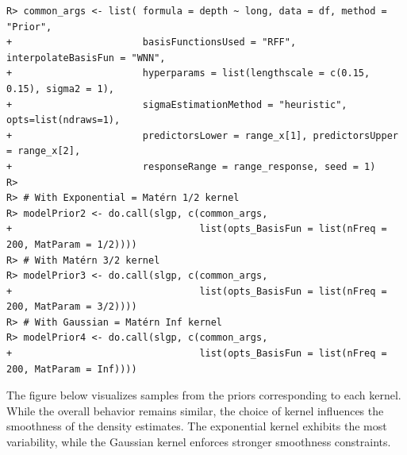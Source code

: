 \documentclass[
]{article}
\begin{document}
\begin{verbatim}
R> common_args <- list( formula = depth ~ long, data = df, method = "Prior",
+                       basisFunctionsUsed = "RFF", interpolateBasisFun = "WNN",
+                       hyperparams = list(lengthscale = c(0.15, 0.15), sigma2 = 1),
+                       sigmaEstimationMethod = "heuristic", opts=list(ndraws=1),
+                       predictorsLower = range_x[1], predictorsUpper = range_x[2],
+                       responseRange = range_response, seed = 1)
R> 
R> # With Exponential = Matérn 1/2 kernel
R> modelPrior2 <- do.call(slgp, c(common_args, 
+                                 list(opts_BasisFun = list(nFreq = 200, MatParam = 1/2))))
R> # With Matérn 3/2 kernel
R> modelPrior3 <- do.call(slgp, c(common_args, 
+                                 list(opts_BasisFun = list(nFreq = 200, MatParam = 3/2))))
R> # With Gaussian = Matérn Inf kernel
R> modelPrior4 <- do.call(slgp, c(common_args, 
+                                 list(opts_BasisFun = list(nFreq = 200, MatParam = Inf))))
\end{verbatim}

The figure below visualizes samples from the priors corresponding to each kernel. While the overall behavior remains similar, the choice of kernel influences the smoothness of the density estimates. The exponential kernel exhibits the most variability, while the Gaussian kernel enforces stronger smoothness constraints.
\end{document}
